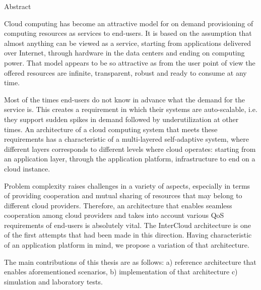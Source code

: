 \vspace*{0.5cm}

\begin{center}
  \LARGE Abstract
\end{center}

Cloud computing has become an attractive model for on demand provisioning of computing resources as services to end-users. It is based on the assumption that almost anything can be viewed as a service, starting from applications delivered over Internet, through hardware in the data centers and ending on computing power. That model appears to be so attractive as from the user point of view the offered resources are infinite, transparent, robust and ready to consume at any time.

Most of the times end-users do not know in advance what the demand for the service is. This creates a requirement in which their systems are auto-scalable, i.e. they support sudden spikes in demand followed by underutilization at other times. An architecture of a cloud computing system that meets these requirements has a characteristic of a multi-layered self-adaptive system, where different layers corresponds to different levels where cloud operates: starting from an application layer, through the application platform, infrastructure to end on a cloud instance.

Problem complexity raises challenges in a variety of aspects, especially in terms of providing cooperation and mutual sharing of resources that may belong to different cloud providers. Therefore, an architecture that enables seamless cooperation among cloud providers and takes into account various QoS requirements of end-users is absolutely vital. The InterCloud architecture is one of the first attempts that had been made in this direction. Having characteristic of an application platform in mind, we propose a variation of that architecture.

The main contributions of this thesis are as follows: a) reference architecture that enables aforementioned scenarios, b) implementation of that architecture c) simulation and laboratory tests.
